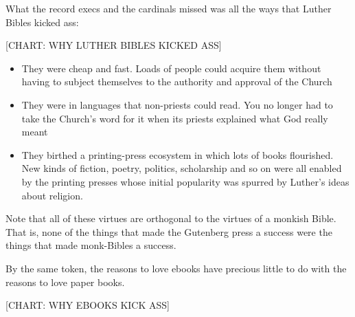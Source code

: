 What the record execs and the cardinals missed was all the ways
that Luther Bibles kicked ass:

[CHART: WHY LUTHER BIBLES KICKED ASS]

\begin{itemize}
\item
  They were cheap and fast. Loads of people could acquire them
  without having to subject themselves to the authority and approval
  of the Church
\item
  They were in languages that non-priests could read. You no longer
  had to take the Church's word for it when its priests explained
  what God really meant
\item
  They birthed a printing-press ecosystem in which lots of books
  flourished. New kinds of fiction, poetry, politics, scholarship and
  so on were all enabled by the printing presses whose initial
  popularity was spurred by Luther's ideas about religion.
\end{itemize}
Note that all of these virtues are orthogonal to the virtues of a
monkish Bible. That is, none of the things that made the Gutenberg
press a success were the things that made monk-Bibles a success.

By the same token, the reasons to love ebooks have precious little
to do with the reasons to love paper books.

[CHART: WHY EBOOKS KICK ASS]

